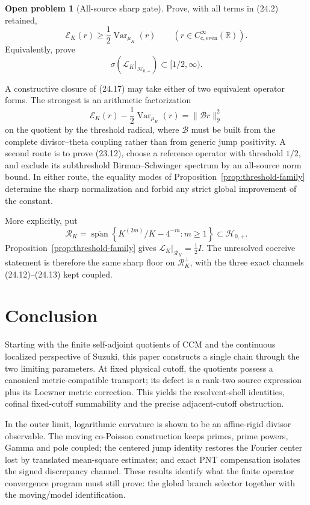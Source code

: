 \documentclass[11pt]{amsart}
\theoremstyle{definition}
\newtheorem{problem}[theorem]{Open problem}
\theoremstyle{remark}
\begin{document}
\begin{problem}[All-source sharp gate]
\label{prob:all-source-gate}
Prove, with all terms in (24.2) retained,
\[
 \boxed{
 \mathscr E_K(r)\ge
 \frac12\operatorname{Var}_{\mu_K}(r)
 \qquad
 (r\in C_{c,\mathrm{even}}^\infty(\mathbb R)).}
\tag{24.17}
\]
Equivalently, prove
\[
 \sigma(\mathcal L_K|_{\mathcal H_{0,+}})
 \subset[1/2,\infty).
\tag{24.18}
\]
\end{problem}

A constructive closure of (24.17) may take either of two equivalent
operator forms.  The strongest is an arithmetic factorization
\[
 \mathscr E_K(r)-\frac12\operatorname{Var}_{\mu_K}(r)
 =\|\mathcal Br\|_{\mathcal Y}^2
\tag{24.19}
\]
on the quotient by the threshold radical, where \(\mathcal B\) must be
built from the complete divisor--theta coupling rather than from generic
jump positivity.  A second route is to prove (23.12), choose a reference
operator with threshold \(1/2\), and exclude its subthreshold
Birman--Schwinger spectrum by an all-source norm bound.  In either route,
the equality modes of Proposition~\ref{prop:threshold-family} determine the
sharp normalization and forbid any strict global improvement of the
constant.

More explicitly, put
\[
 \mathcal R_K=
 \overline{\operatorname{span}}
 \left\{K^{(2m)}/K-4^{-m}:m\ge1\right\}
 \subset\mathcal H_{0,+}.
\tag{24.20}
\]
Proposition~\ref{prop:threshold-family} gives
\(\mathcal L_K|_{\mathcal R_K}=\tfrac12I\).  The unresolved
coercive statement is therefore the same sharp floor on
\(\mathcal R_K^\perp\), with the three exact channels
(24.12)--(24.13) kept coupled.

\section{Conclusion}

Starting with the finite self-adjoint quotients of CCM and the continuous
localized perspective of Suzuki, this paper constructs a single chain
through the two limiting parameters.  At fixed physical cutoff, the
quotients possess a canonical metric-compatible transport; its defect is a
rank-two source expression plus its Loewner metric correction.  This yields
the resolvent-shell identities, cofinal fixed-cutoff summability and the
precise adjacent-cutoff obstruction.

In the outer limit, logarithmic curvature is shown to be an affine-rigid
divisor observable.  The moving co-Poisson construction keeps primes,
prime powers, Gamma and pole coupled; the centered jump identity restores
the Fourier center lost by translated mean-square estimates; and exact PNT
compensation isolates the signed discrepancy channel.  These results
identify what the finite operator convergence program must still prove:
the global branch selector together with the moving/model identification.
\end{document}
